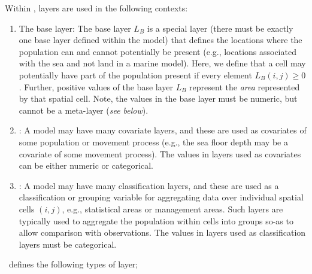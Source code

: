 Within \IBM, layers are used in the following contexts:
\begin{enumerate}
	\item The base layer: The base layer $L_B$ is a special layer (there must be exactly one base layer defined within the model) that defines the locations where the population can and cannot potentially be present (e.g., locations associated with the sea and not land in a marine model). Here, we define that a cell may potentially have part of the population present if every element $L_B(i,j) \ge 0$. Further, positive values of the base layer $L_B$ represent the \emph{area} represented by that spatial cell. Note, the values in the base layer must be numeric, but cannot be a meta-layer (\emph{see below}).
	\item {}: A model may have many covariate layers, and these are used as covariates of some population or movement process (e.g., the sea floor depth may be a covariate of some movement process). The values in layers used as covariates can be either numeric or categorical.
	\item {}: A model may have many classification layers, and these are used as a classification or grouping variable for aggregating data over individual spatial cells $(i,j)$, e.g., statistical areas or management areas. Such layers are typically used to aggregate the population within cells into groups so-as to allow comparison with observations. The values in layers used as classification layers must be categorical.
\end{enumerate}

\IBM\ defines the following types of layer;


